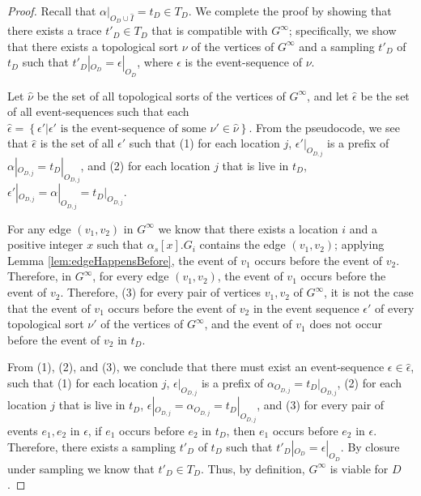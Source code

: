 \documentclass[11pt]{article}
\numberwithin{theorem}{section}
\newcommand{\set}[1]{\left\{#1\right\}}
\begin{document}
\begin{proof}
Recall that $\alpha|_{O_D \cup \hat{I}} = t_D \in T_D$. We complete the proof by showing that there exists a trace $t'_D \in T_D$ that is compatible with $G^\infty$; specifically, we show that there exists a topological sort $\nu$ of the vertices of $G^\infty$ and a sampling $t'_D$ of $t_D$ such that $t'_D|_{O_D} = \epsilon|_{O_D}$, where $\epsilon$ is the event-sequence of $\nu$.

Let $\widehat{\nu}$ be the set of all topological sorts of the vertices of $G^\infty$, and let $\widehat{\epsilon}$ be the set of all event-sequences such that each $\widehat{\epsilon} = \set{ \epsilon' | \epsilon' \text{ is the event-sequence of some } \nu' \in \widehat{\nu}}$. From the pseudocode, we see that $\widehat{\epsilon}$ is the set of all $\epsilon'$ such that (1) for each location $j$, $\epsilon'|_{O_{D,j}}$ is a prefix of $\alpha|_{O_{D,j}} = t_D|_{O_{D,j}}$, and (2) for each location $j$ that is live in $t_D$, $\epsilon'|_{O_{D,j}} = \alpha|_{O_{D,j}} = t_D|_{O_{D,j}}$.

For any edge $(v_1,v_2)$ in $G^\infty$ we know that there exists a location $i$ and a positive integer $x$ such that $\alpha_s[x].G_i$ contains the edge $(v_1,v_2)$; applying Lemma \ref{lem:edgeHappensBefore}, the event of $v_1$ occurs before the event of
$v_2$. Therefore, in $G^\infty$, for every edge $(v_1,v_2)$, the event
of $v_1$ occurs before the event of $v_2$. Therefore, (3) for every pair of vertices $v_1,v_2$ of $G^\infty$, it is not the case that the event of $v_1$ occurs before the event of $v_2$ in the event sequence $\epsilon'$ of every topological sort $\nu'$ of the vertices of $G^\infty$, and the event of $v_1$ does not occur before the event of $v_2$ in $t_D$.

From (1), (2), and (3), we conclude that there must exist an event-sequence $\epsilon \in \widehat{\epsilon}$, such that (1) for each location $j$, $\epsilon|_{O_{D,j}}$ is a prefix of $\alpha_{O_{D,j}} = t_D|_{O_{D,j}}$, (2) for each location $j$ that is live in $t_D$, $\epsilon|_{O_{D,j}} = \alpha_{O_{D,j}} = t_D|_{O_{D,j}}$, and (3) for every pair of events $e_1, e_2$ in $\epsilon$, if $e_1$ occurs before $e_2$ in $t_D$, then $e_1$ occurs before $e_2$ in $\epsilon$. Therefore, there exists a sampling $t'_D$ of $t_D$ such that  $t'_D|_{O_D} = \epsilon|_{O_D}$.
By closure under sampling we know that $t'_D \in T_D$. 
Thus, by definition, $G^\infty$ is viable for $D$.
\end{proof}
\end{document}
